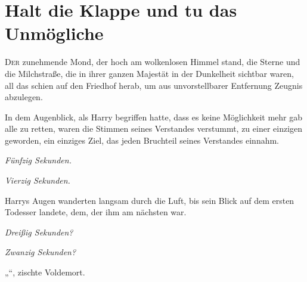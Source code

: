 \chapter{Halt die Klappe und tu das Unmögliche}

\lettrine{D}{er} zunehmende Mond, der hoch am wolkenlosen Himmel stand, die Sterne und die Milchstraße, die in ihrer ganzen Majestät in der Dunkelheit sichtbar waren, all das schien auf den Friedhof herab, um aus unvorstellbarer Entfernung Zeugnis abzulegen.

In dem Augenblick, als Harry begriffen hatte, dass es keine Möglichkeit mehr gab alle zu retten, waren die Stimmen seines Verstandes verstummt, zu einer einzigen geworden, ein einziges Ziel, das jeden Bruchteil seines Verstandes einnahm.

\emph{Fünfzig Sekunden.}

\emph{Vierzig Sekunden.}

Harrys Augen wanderten langsam durch die Luft, bis sein Blick auf dem ersten Todesser landete, dem, der ihm am nächsten war.

\emph{Dreißig Sekunden?}

\emph{Zwanzig Sekunden?}

„“, zischte Voldemort.

